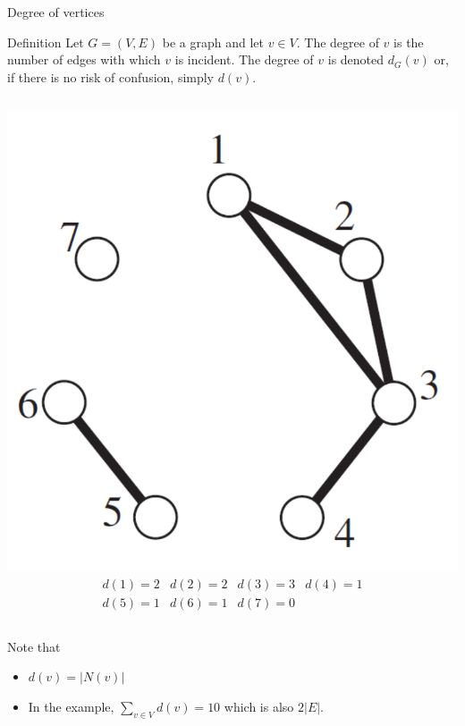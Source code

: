 \documentclass{beamer}
\def\bl[#1]#2{\begin{block}{#1}#2\end{block}}
\def\itemb{\begin{itemize}}
\def\iteme{\end{itemize}}
\begin{document}
\begin{frame}{Degree of vertices}
\bl[Definition]{
Let $G=(V,E)$ be a graph and let $v\in V$. The degree of $v$ is the number of edges with which $v$ is incident. The degree of $v$ is denoted $d_G(v)$ or, if there is no risk of confusion, simply $d(v)$.
}
\begin{columns}

\includegraphics[scale=0.2]{Example1Visual.pdf}
\[
\begin{array}{llll}
d(1)=2&d(2)=2&d(3)=3& d(4)=1\\
d(5)=1& d(6)=1& d(7)=0
\end{array}
\]
\end{columns}
Note that
\itemb
\item $d(v)=|N(v)|$
\item In the example, $\sum_{v\in V}d(v)=10$ which is also $2|E|$.
\iteme
\end{frame}
\end{document}
